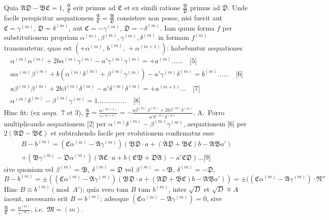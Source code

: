 \documentclass[12pt,a4paper]{article}
\theoremstyle{plain}
\theoremstyle{definition}
\theoremstyle{remark}
\begin{document}
Quia $\mathfrak{A}\mathfrak{D}-\mathfrak{B}\mathfrak{C}=1$, $\frac{\mathfrak{A}}{\mathfrak{C}}$ erit primus ad $\mathfrak{C}$ et ex simili ratione $\frac{\mathfrak{B}}{\mathfrak{D}}$ primus ad $\mathfrak{D}$. Unde facile perspicitur aequationem $\frac{\mathfrak{A}}{\mathfrak{C}}=\frac{\mathfrak{B}}{\mathfrak{D}}$ consistere non posse, nisi fuerit aut $\mathfrak{C}=\gamma^{(m)}$, $\mathfrak{D}=\delta^{(m)}$, aut $\mathfrak{C}=-\gamma^{(m)}$, $\mathfrak{D}=-\delta^{(m)}$. Iam quum forma $f$ per substitutionem propriam $\alpha^{(m)},\beta^{(m)},\gamma^{(m)},\delta^{(m)}$ in formam $f^{(m)}$ transmutetur, quae est $(+\alpha^{(m)},\, b^{(m)},\, +\alpha^{(m+1)})$: habebuntur aequationes
\begin{gather*}
\alpha^{(m)}\alpha^{(m)}+2b\alpha^{(m)}\gamma^{(m)}-a'\gamma^{(m)}\gamma^{(m)}=+a^{(m)}\ldots\ldots\quad\text{[5]}\\
a\alpha^{(m)}\beta^{(m)}+b(\alpha^{(m)}\delta^{(m)}+\beta^{(m)}\gamma^{(m)})-a'\gamma^{(m)}\delta^{(m)}=b^{(m)}\ldots\ldots\quad\text{[6]}\\
a\beta^{(m)}\beta^{(m)}+2b\beta^{(m)}\delta^{(m)}-a'\delta^{(m)}\delta^{(m)}=+a^{(m+1)}\ldots\quad\text{[7]}\\
\alpha^{(m)}\delta^{(m)}-\beta^{(m)}\gamma^{(m)}=1\ldots\ldots\ldots\ldots\ldots\quad\text{[8]}
\end{gather*}
Hinc fit: (ex aequ.\ 7 et 3), $\frac{\mathfrak{A}}{\mathfrak{C}}=\frac{\alpha^{(m+1)}}{\gamma^{(m+1)}}=-\frac{a\beta^{(m)}\beta^{(m)}+2b\beta^{(m)}\delta^{(m)}}{a'\delta^{(m)}\delta^{(m)}}$. A.\ Porro multiplicando aequationem [2] per $\alpha^{(m)}\delta^{(m)}-\beta^{(m)}\gamma^{(m)}$, aequationem [6] per $2(\mathfrak{A}\mathfrak{D}-\mathfrak{B}\mathfrak{C})$ et subtrahendo facile per evolutionem confirmatur esse
\begin{multline*}
B-b^{(m)}=(\mathfrak{C}\alpha^{(m)}-\mathfrak{A}\gamma^{(m)})(\mathfrak{B}\mathfrak{D}\cdot a+(\mathfrak{A}\mathfrak{D}+\mathfrak{B}\mathfrak{C})b-\mathfrak{A}\mathfrak{B}a')\\
+(\mathfrak{B}\gamma^{(m)}-\mathfrak{D}\alpha^{(m)})(\mathfrak{A}\mathfrak{C}\cdot a+b(\mathfrak{C}\mathfrak{B}+\mathfrak{D}\mathfrak{A})-a'\mathfrak{C}\mathfrak{D})\ldots\text{[9]}
\end{multline*}
sive quoniam vel $\beta^{(m)}=\mathfrak{B}$, $\delta^{(m)}=\mathfrak{D}$ vel $\beta^{(m)}=-\mathfrak{B}$, $\delta^{(m)}=-\mathfrak{D}$,
\[B-b^{(m)}=\pm((\mathfrak{C}\alpha^{(m)}-\mathfrak{A}\gamma^{(m)})(\mathfrak{B}\mathfrak{D}\cdot a+(\mathfrak{A}\mathfrak{D}+\mathfrak{B}\mathfrak{C})b-\mathfrak{A}\mathfrak{B}a'))=\pm((\mathfrak{C}\alpha^{(m)}-\mathfrak{A}\gamma^{(m)})\cdot\mathfrak{N}''\]
Hinc $B\equiv b^{(m)}\pmod{A'}$; quia vero tum $B$ tum $b^{(m)}$, inter $\sqrt{D}$ et $\sqrt{D}\mp A$ iacent, necessario erit $B=b^{(m)}$; adeoque $(\mathfrak{C}\alpha^{(m)}-\mathfrak{A}\gamma^{(m)})=0$, sive $\frac{\mathfrak{A}}{\mathfrak{C}}=\frac{\alpha^{(m)}}{\gamma^{(m)}}$, i.e.\ $\mathfrak{M}=(m)$.
\end{document}
